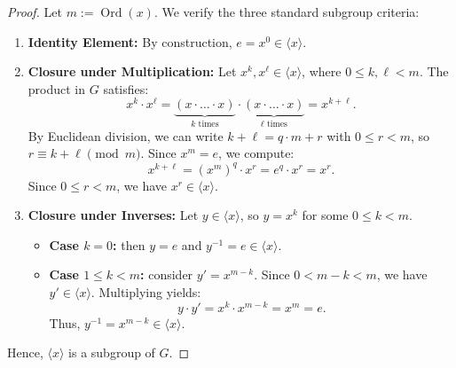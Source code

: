 \begin{content}

\begin{proof}
Let $m := \operatorname{Ord}(x)$. We verify the three standard subgroup criteria:
\begin{enumerate}
    \item \textbf{Identity Element:}
    By construction, $e = x^0 \in \langle x \rangle$.

    \item \textbf{Closure under Multiplication:}
    Let $x^k, x^\ell \in \langle x \rangle$, where $0 \le k, \ell < m$. The product in $G$ satisfies:
    \[
    x^k \cdot x^\ell = \underbrace{(x \cdot \dots \cdot x)}_{k \text{ times}} \cdot \underbrace{(x \cdot \dots \cdot x)}_{\ell \text{ times}} = x^{k+\ell}.
    \]
    By Euclidean division, we can write $k + \ell = q \cdot m + r$ with $0 \le r < m$, so $r \equiv k + \ell \pmod m$. Since $x^m = e$, we compute:
    \[
    x^{k+\ell} = (x^m)^q \cdot x^r = e^q \cdot x^r = x^r.
    \]
    Since $0 \le r < m$, we have $x^r \in \langle x \rangle$.

    \item \textbf{Closure under Inverses:}
    Let $y \in \langle x \rangle$, so $y = x^k$ for some $0 \le k < m$.
    \begin{itemize}
        \item \textbf{Case $k = 0$:} then $y = e$ and $y^{-1} = e \in \langle x \rangle$.
        \item \textbf{Case $1 \le k < m$:} consider $y' = x^{m - k}$. Since $0 < m - k < m$, we have $y' \in \langle x \rangle$. Multiplying yields:
        \[
        y \cdot y' = x^k \cdot x^{m-k} = x^m = e.
        \]
        Thus, $y^{-1} = x^{m-k} \in \langle x \rangle$.
    \end{itemize}
\end{enumerate}
Hence, $\langle x \rangle$ is a subgroup of $G$.
\end{proof}



\end{content}
